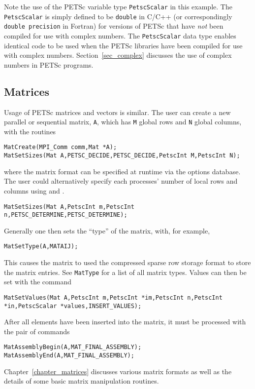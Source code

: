 Note the use of the PETSc variable type \lstinline{PetscScalar} in this example.
The \lstinline{PetscScalar} is simply defined to be \lstinline{double} in C/C++
(or correspondingly \lstinline{double precision} in Fortran) for versions of
PETSc that have {\em not} been compiled for use with complex numbers.
The \lstinline{PetscScalar} data type enables
identical code to be used when the PETSc libraries have been compiled
for use with complex numbers.  Section~\ref{sec_complex} discusses the
use of complex numbers in PETSc programs.

\subsection*{Matrices}
\label{sec_matintro}
Usage of PETSc matrices and vectors is similar. 
The user can create a new parallel or sequential matrix, \lstinline{A}, which
has \lstinline{M} global rows and \lstinline{N} global columns, with the routines
\begin{lstlisting}
MatCreate(MPI_Comm comm,Mat *A);
MatSetSizes(Mat A,PETSC_DECIDE,PETSC_DECIDE,PetscInt M,PetscInt N);
\end{lstlisting}
where the matrix format can be specified at runtime via the options database.  The user could
alternatively specify each processes' number of local rows and columns
using  and .
\begin{lstlisting}
MatSetSizes(Mat A,PetscInt m,PetscInt n,PETSC_DETERMINE,PETSC_DETERMINE);
\end{lstlisting}
Generally one then sets the ``type'' of the matrix, with, for example,
\begin{lstlisting}
MatSetType(A,MATAIJ);
\end{lstlisting}
This causes the matrix  to used the compressed sparse row storage format to store the
matrix entries. See \lstinline{MatType} for a list of all matrix types.
Values can then be set with the command
\begin{lstlisting}
MatSetValues(Mat A,PetscInt m,PetscInt *im,PetscInt n,PetscInt *in,PetscScalar *values,INSERT_VALUES);
\end{lstlisting}
After all elements have been inserted into the
matrix, it must be processed with the pair of commands
\begin{lstlisting}
MatAssemblyBegin(A,MAT_FINAL_ASSEMBLY);
MatAssemblyEnd(A,MAT_FINAL_ASSEMBLY);
\end{lstlisting}
Chapter~\ref{chapter_matrices} discusses various matrix formats as
well as the details of some basic matrix manipulation routines.

